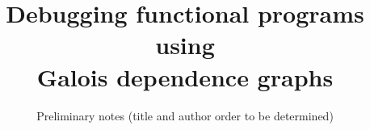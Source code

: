 \documentclass[preprint,draft,acmsmall,screen]{acmart}
\begin{document}
\title[Debugging functional programs using Galois dependence graphs]{Debugging functional programs using \\Galois dependence graphs}
\subtitle{Preliminary notes (title and author order to be determined)}

\maketitle

%




\clearpage
\pagebreak

\clearpage
\pagebreak
\appendix





\end{document}
